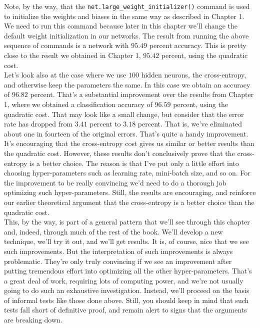 \documentclass[a4paper,11pt,twoside]{report}
\begin{document}
Note, by the way, that the \texttt{net.large\_weight\_initializer()} command is used to initialize the weights and biases in the same way as described in Chapter 1. We need to run this command because later in this chapter we'll change the default weight initialization in our networks. The result from running the above sequence of commands is a network with $95.49$ percent accuracy. This is pretty close to the result we obtained in Chapter 1, $95.42$ percent, using the quadratic cost.\\

Let's look also at the case where we use $100$ hidden neurons, the cross-entropy, and otherwise keep the parameters the same. In this case we obtain an accuracy of $96.82$ percent. That's a substantial improvement over the results from Chapter 1, where we obtained a classification accuracy of $96.59$ percent, using the quadratic cost. That may look like a small change, but consider that the error rate has dropped from $3.41$ percent to $3.18$ percent. That is, we've eliminated about one in fourteen of the original errors. That's quite a handy improvement.\\

It's encouraging that the cross-entropy cost gives us similar or better results than the quadratic cost. However, these results don't conclusively prove that the cross-entropy is a better choice. The reason is that I've put only a little effort into choosing hyper-parameters such as learning rate, mini-batch size, and so on. For the improvement to be really convincing we'd need to do a thorough job optimizing such hyper-parameters. Still, the results are encouraging, and reinforce our earlier theoretical argument that the cross-entropy is a better choice than the quadratic cost.\\

This, by the way, is part of a general pattern that we'll see through this chapter and, indeed, through much of the rest of the book. We'll develop a new technique, we'll try it out, and we'll get  results. It is, of course, nice that we see such improvements. But the interpretation of such improvements is always problematic. They're only truly convincing if we see an improvement after putting tremendous effort into optimizing all the other hyper-parameters. That's a great deal of work, requiring lots of computing power, and we're not usually going to do such an exhaustive investigation. Instead, we'll proceed on the basis of informal tests like those done above. Still, you should keep in mind that such tests fall short of definitive proof, and remain alert to signs that the arguments are breaking down.\\
\end{document}
